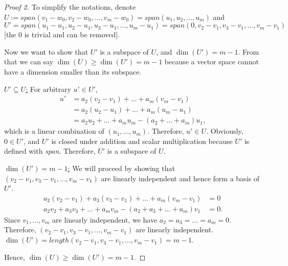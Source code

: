 \documentclass{article}
\begin{document}
\begin{proof}[Proof 2]
    To simplify the notations, denote $U:=span (v_1 - w_0, v_2 - w_0, \dots, v_m - w_0) 
    = span(u_1, u_2, \dots, u_m)$ and $U' = span(u_1-u_1, u_2-u_1, u_3-u_1, \dots, u_m-u_1) = 
    span(0, v_2-v_1, v_3-v_1,\dots, v_m-v_1)$ [the 0 is trivial and can be removed].
    
    Now we want to show that $U'$ is a subspace of $U$, and $\dim (U')=m-1$. From that we can say 
    $\dim (U) \ge \dim (U') = m-1$ because a vector space cannot have a dimension smaller than its subspace.

    \bigbreak
    \underline{$U' \subseteq U$:} For arbitrary $u'\in U'$,
    \begin{align*}
        u' & = a_2(v_2-v_1) + \dots + a_m(v_m-v_1) \\
        & = a_2(u_2-u_1) + \dots + a_m(u_m-u_1) \\
        & = a_2u_2 + \dots + a_mu_m - (a_2+\dots+a_m)u_1,
    \end{align*}
    which is a linear combination of $(u_1, \dots, u_m)$. Therefore, $u'\in U$. Obviously, $0\in U'$,
    and $U'$ is closed under addition and scalar multiplication because $U'$ is defined with 
    \emph{span}. Therefore, $U'$ is a subspace of $U$.

    \bigbreak
    \underline{$\dim (U') = m-1$:} We will proceed by showing that $(v_2-v_1, v_3-v_1, \dots, 
    v_m-v_1)$ are linearly independent and hence form a basis of $U'$.
    \begin{align*}
        a_2(v_2-v_1) + a_3(v_3-v_1) + \dots + a_m(v_m-v_1) & = 0 \\
        a_2v_2 + a_3v_3 + \dots + a_mv_m - (a_2+a_3+\dots+a_m)v_1 & = 0.
    \end{align*}
    Since $v_1, \dots, v_m$ are linearly independent, we have $a_2=a_3=\dots=a_m=0$. Therefore, 
    $(v_2-v_1, v_3-v_1, \dots, v_m-v_1)$ are linearly independent. 
    $\dim (U') = length(v_2-v_1, v_3-v_1, \dots, v_m-v_1) = m-1$.

    Hence, $\dim (U) \ge \dim (U') = m-1$.
    
\end{proof}

\newpage
\end{document}
